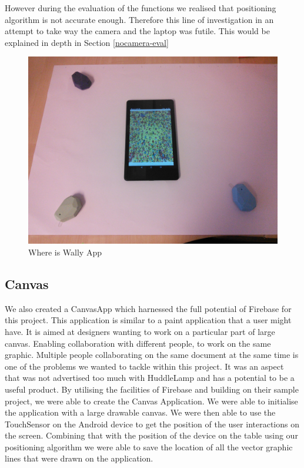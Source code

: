 However during the evaluation of the functions we realised that positioning algorithm is not accurate enough. Therefore this line of investigation in an attempt to take way the camera and the laptop was futile. This would be explained in depth in Section \ref{nocamera-eval}

\begin{figure}[h]
\centering
  \includegraphics[scale=0.1]{images/setup}
  \protect\caption{Where is Wally App} 
  \label{where_is_wally_setup}
\end{figure}

\subsection{Canvas}
We also created a CanvasApp which harnessed the full potential of Firebase for this project. This application is similar to a paint application that a user might have. It is aimed at designers wanting to work on a particular part of large canvas. Enabling collaboration with different people, to work on the same graphic. Multiple people collaborating on the same document at the same time is one of the problems we wanted to tackle within this project. It was an aspect that was not advertised too much with HuddleLamp and has a potential to be a useful product. 
By utilising the facilities of Firebase and building on their sample project\cite{firebase-drawing}, we were able to create the Canvas Application. We were able to initialise the application with a large drawable canvas. We were then able to use the TouchSensor on the Android device to get the position of the user interactions on the screen. Combining that with the position of the device on the table using our positioning algorithm we were able to save the location of all the vector graphic lines that were drawn on the application.


